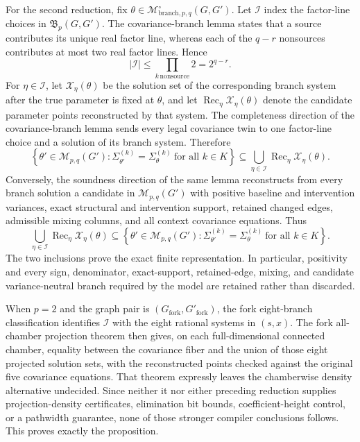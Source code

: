 For the second reduction, fix \(\theta\in\mathcal M^{\circ}_{\mathrm{branch},p,q}(G,G')\).  Let \(\mathcal I\) index the factor-line choices in \(\mathfrak B_p(G,G')\).  The covariance-branch lemma states that a source contributes its unique real factor line, whereas each of the \(q-r\) nonsources contributes at most two real factor lines.  Hence
\[
 |\mathcal I|\le \prod_{k\,\mathrm{nonsource}}2=2^{q-r}.
\]
For \(\eta\in\mathcal I\), let \(\mathcal X_\eta(\theta)\) be the solution set of the corresponding branch system after the true parameter is fixed at \(\theta\), and let \(\operatorname{Rec}_\eta\mathcal X_\eta(\theta)\) denote the candidate parameter points reconstructed by that system.  The completeness direction of the covariance-branch lemma sends every legal covariance twin to one factor-line choice and a solution of its branch system.  Therefore
\[
 \left\{\theta'\in\mathcal M_{p,q}(G'):
   \Sigma_{\theta'}^{(k)}=\Sigma_{\theta}^{(k)}\ \text{for all }k\in K\right\}
 \subseteq
 \bigcup_{\eta\in\mathcal I}\operatorname{Rec}_\eta\mathcal X_\eta(\theta).
\]
Conversely, the soundness direction of the same lemma reconstructs from every branch solution a candidate in \(\mathcal M_{p,q}(G')\) with positive baseline and intervention variances, exact structural and intervention support, retained changed edges, admissible mixing columns, and all context covariance equations.  Thus
\[
 \bigcup_{\eta\in\mathcal I}\operatorname{Rec}_\eta\mathcal X_\eta(\theta)
 \subseteq
 \left\{\theta'\in\mathcal M_{p,q}(G'):
   \Sigma_{\theta'}^{(k)}=\Sigma_{\theta}^{(k)}\ \text{for all }k\in K\right\}.
\]
The two inclusions prove the exact finite representation.  In particular, positivity and every sign, denominator, exact-support, retained-edge, mixing, and candidate variance-neutral branch required by the model are retained rather than discarded.

When \(p=2\) and the graph pair is \((G_{\mathrm{fork}},G'_{\mathrm{fork}})\), the fork eight-branch classification identifies \(\mathcal I\) with the eight rational systems in \((s,x)\).  The fork all-chamber projection theorem then gives, on each full-dimensional connected chamber, equality between the covariance fiber and the union of those eight projected solution sets, with the reconstructed points checked against the original five covariance equations.  That theorem expressly leaves the chamberwise density alternative undecided.  Since neither it nor either preceding reduction supplies projection-density certificates, elimination bit bounds, coefficient-height control, or a pathwidth guarantee, none of those stronger compiler conclusions follows.  This proves exactly the proposition.
